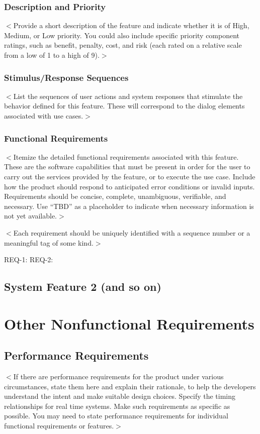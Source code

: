 \documentclass{scrreprt}
\begin{document}
\subsection{Description and Priority}
$<$Provide a short description of the feature and indicate whether it is of 
High, Medium, or Low priority. You could also include specific priority 
component ratings, such as benefit, penalty, cost, and risk (each rated on a 
relative scale from a low of 1 to a high of 9).$>$

\subsection{Stimulus/Response Sequences}
$<$List the sequences of user actions and system responses that stimulate the 
behavior defined for this feature. These will correspond to the dialog elements 
associated with use cases.$>$

\subsection{Functional Requirements}
$<$Itemize the detailed functional requirements associated with this feature.  
These are the software capabilities that must be present in order for the user 
to carry out the services provided by the feature, or to execute the use case.  
Include how the product should respond to anticipated error conditions or 
invalid inputs. Requirements should be concise, complete, unambiguous, 
verifiable, and necessary. Use “TBD” as a placeholder to indicate when necessary 
information is not yet available.$>$

$<$Each requirement should be uniquely identified with a sequence number or a 
meaningful tag of some kind.$>$

REQ-1:	REQ-2:

\section{System Feature 2 (and so on)}


\chapter{Other Nonfunctional Requirements}

\section{Performance Requirements}
$<$If there are performance requirements for the product under various 
circumstances, state them here and explain their rationale, to help the 
developers understand the intent and make suitable design choices. Specify the 
timing relationships for real time systems. Make such requirements as specific 
as possible. You may need to state performance requirements for individual 
functional requirements or features.$>$
\end{document}
